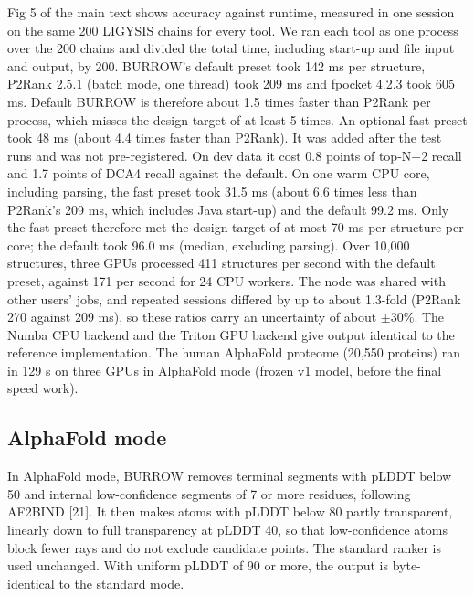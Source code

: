 \documentclass[10pt,letterpaper]{article}
\begin{document}
Fig 5 of the main text shows accuracy against runtime, measured in one session on the same 200 LIGYSIS chains for every tool. We ran each tool as one process over the 200 chains and divided the total time, including start-up and file input and output, by 200. BURROW's default preset took 142 ms per structure, P2Rank 2.5.1 (batch mode, one thread) took 209 ms and fpocket 4.2.3 took 605 ms. Default BURROW is therefore about 1.5 times faster than P2Rank per process, which misses the design target of at least 5 times. An optional fast preset took 48 ms (about 4.4 times faster than P2Rank). It was added after the test runs and was not pre-registered. On dev data it cost 0.8 points of top-N+2 recall and 1.7 points of DCA4 recall against the default. On one warm CPU core, including parsing, the fast preset took 31.5 ms (about 6.6 times less than P2Rank's 209 ms, which includes Java start-up) and the default 99.2 ms. Only the fast preset therefore met the design target of at most 70 ms per structure per core; the default took 96.0 ms (median, excluding parsing). Over 10,000 structures, three GPUs processed 411 structures per second with the default preset, against 171 per second for 24 CPU workers. The node was shared with other users' jobs, and repeated sessions differed by up to about 1.3-fold (P2Rank 270 against 209 ms), so these ratios carry an uncertainty of about $\pm$30\%. The Numba CPU backend and the Triton GPU backend give output identical to the reference implementation. The human AlphaFold proteome (20,550 proteins) ran in 129 s on three GPUs in AlphaFold mode (frozen v1 model, before the final speed work).

\subsection*{AlphaFold mode}

In AlphaFold mode, BURROW removes terminal segments with pLDDT below 50 and internal low-confidence segments of 7 or more residues, following AF2BIND [21]. It then makes atoms with pLDDT below 80 partly transparent, linearly down to full transparency at pLDDT 40, so that low-confidence atoms block fewer rays and do not exclude candidate points. The standard ranker is used unchanged. With uniform pLDDT of 90 or more, the output is byte-identical to the standard mode.
\end{document}
